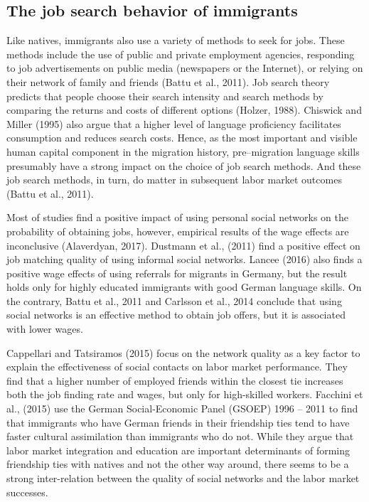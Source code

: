 \documentclass[12pt,a4paper]{article}
\begin{document}
\subsection{The job search behavior of immigrants}

Like natives, immigrants also use a variety of methods to seek for jobs. These methods include the use of public and private employment agencies, responding to job advertisements on public media (newspapers or the Internet), or relying on their network of family and friends (Battu et al., 2011). Job search theory predicts that people choose their search intensity and search methods by comparing the returns and costs of different options (Holzer, 1988). Chiswick and Miller (1995) also argue that a higher level of language proficiency facilitates consumption and reduces search costs. Hence, as the most important and visible human capital component in the migration history, pre--migration language skills presumably have a strong impact on the choice of job search methods. And these job search methods, in turn, do matter in subsequent labor market outcomes (Battu et al., 2011).

Most of studies find a positive impact of using personal social networks on the probability of obtaining jobs, however, empirical results of the wage effects are inconclusive (Alaverdyan, 2017). Dustmann et al., (2011) find a positive effect on job matching quality of using informal social networks. Lancee (2016) also finds a positive wage effects of using referrals for migrants in Germany, but the result holds only for highly educated immigrants with good German language skills. On the contrary, Battu et al., 2011 and Carlsson et al., 2014 conclude that using social networks is an effective method to obtain job offers, but it is associated with lower wages. 

Cappellari and Tatsiramos (2015) focus on the network quality as a key factor to explain the effectiveness of social contacts on labor market performance. They find that a higher number of employed friends within the closest tie increases both the job finding rate and wages, but only for high-skilled workers. Facchini et al., (2015) use the German Social-Economic Panel (GSOEP) 1996 -- 2011 to find that immigrants who have German friends in their friendship ties tend to have faster cultural assimilation than immigrants who do not. While they argue that labor market integration and education are important determinants of forming friendship ties with natives and not the other way around, there seems to be a strong inter-relation between the quality of social networks and the labor market successes.
\end{document}
